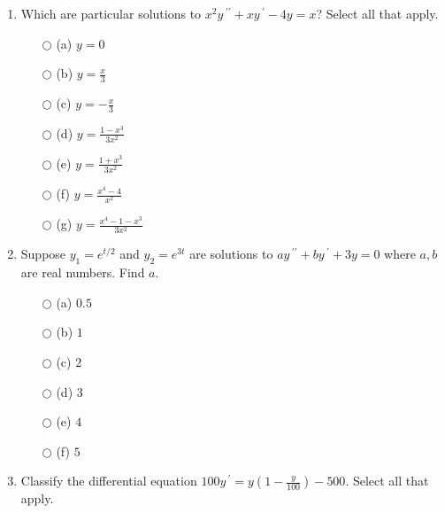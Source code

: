 \documentclass{ximera}
\begin{document}
\begin{enumerate}[label=(\arabic*)]
\item Which are particular solutions to $x^2y\,^{\prime\prime}+xy\,^{\prime}-4y=x$?   Select all that apply.



\begin{enumerate}[label=(\alph*)]
		\item[$\bigcirc$ (a)] $y=0$ 
		\item[$\bigcirc$ (b)] $\displaystyle  y=\frac{x}{3}$ 
		\item[$\bigcirc$ (c)] $\displaystyle  y=-\frac{x}{3}$ %
		\item[$\bigcirc$ (d)] $\displaystyle  y=\frac{1-x^3}{3x^2}$  %
 		\item[$\bigcirc$ (e)] $\displaystyle  y=\frac{1+x^3}{3x^2}$
 		\item[$\bigcirc$ (f)] $\displaystyle  y=\frac{x^4-4}{x^2}$
 		\item[$\bigcirc$ (g)] $\displaystyle  y=\frac{x^4-1-x^3}{3x^2}$  %

	\end{enumerate} 
    

\newpage

\item Suppose $y_1=e^{t/2}$ and $y_2=e^{3t}$ are solutions to $ay\,^{\prime\prime}+by\,^{\prime}+3y=0$ where $a,b$ are real numbers.  Find $a$.\\


\begin{enumerate}[label=(\alph*)]
   	    \item[$\bigcirc$ (a)] $0.5$\\
		\item[$\bigcirc$ (b)] $1$\\
		\item[$\bigcirc$ (c)] $2$\\  %
		\item[$\bigcirc$ (d)] $3$\\
		\item[$\bigcirc$ (e)] $4$\\
   	    \item[$\bigcirc$ (f)] $5$\\
	\end{enumerate} 




\item Classify the differential equation $100y\,^{\prime}=y\left(1-\frac{y}{100}\right)-500$. Select all that apply.


\end{enumerate}
\end{document}
